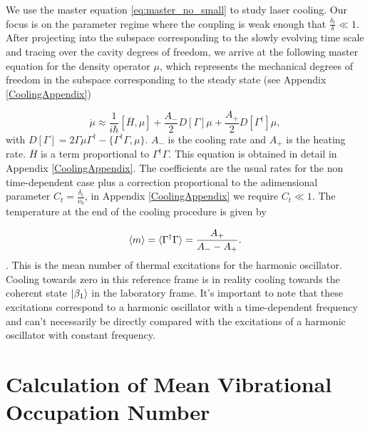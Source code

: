 \documentclass[reprint, amsmath,amssymb, aps,pra]{revtex4-1}
\begin{document}
We use the master equation \eqref{eq:master_no_small} to study laser
cooling. Our focus is on the parameter regime where the coupling is
weak enough that $\frac{\delta_t}{\delta}\ll 1$. After projecting into
the subspace corresponding to the slowly evolving time scale and
tracing over the cavity degrees of freedom, we arrive at the following
master equation for the density operator $\mu$, which represents the
mechanical degrees of freedom in the subspace corresponding to the
steady state (see Appendix \ref{CoolingAppendix})

\begin{equation}\label{eq:ProyectedMasterEqCooling}
\dot{\mu} \approx \frac{1}{i\hbar}[\overline{H},\mu] + \frac{A_-}{2}D[\Gamma]\mu + \frac{A_+}{2}D[\Gamma^\dagger]\mu, 
\end{equation}
with
$D[\Gamma] = 2\Gamma \mu \Gamma^\dagger -\{\Gamma^\dagger \Gamma,
\mu\}$. $A_-$ is the cooling rate and $A_+$ is the heating rate.
$\overline{H}$ is a term proportional
to $\Gamma^\dagger \Gamma$. This equation is obtained in detail in
Appendix \ref{CoolingAppendix}. The coefficients are the usual rates
for the non time-dependent case plus a correction proportional to the
adimensional parameter $C_t=\frac{\delta_t}{\nu_0}$, in Appendix
\ref{CoolingAppendix} we require $C_t \ll 1$. The temperature at the
end of the cooling procedure is given by

\begin{equation}
\expval{m} =\langle \Gamma^\dagger \Gamma \rangle = \frac{A_+}{A_- - A_+}.
\end{equation}
.
This is the mean number of thermal excitations for the harmonic
oscillator. Cooling towards zero in this reference frame is in
reality cooling towards the coherent state $\ket{\beta_1}$ in the
laboratory frame. It's important to note that these excitations
correspond to a harmonic oscillator with a time-dependent frequency
and can't necessarily be directly compared with the excitations of a
harmonic oscillator with constant frequency.



\section{Calculation of Mean Vibrational Occupation Number}\label{NumCal}
\end{document}
